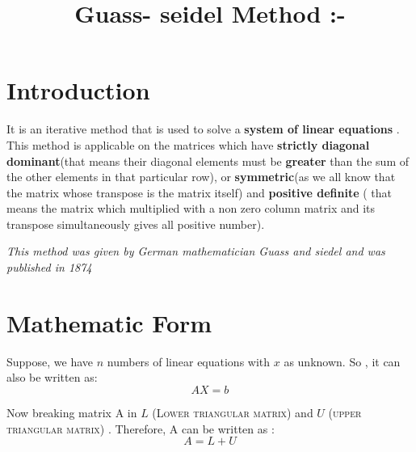 \documentclass{article}
\title{Guass- seidel Method :-}
\begin{document}
\maketitle
\section{Introduction }
It is an iterative method that is used to solve a \textbf{system of linear equations }. This method is applicable on the matrices which have \textbf{ strictly diagonal dominant}(that means their diagonal elements must be \textbf{greater} than the sum of the other elements in that particular row), or \textbf{symmetric}(as we all know that the matrix whose transpose is the matrix itself) and \textbf{positive definite} ( that means the matrix which multiplied with a non zero column matrix and its transpose simultaneously gives all positive number).

\textit{This method was given by German mathematician Guass and siedel and was published in 1874}

\section{Mathematic Form}

Suppose, we have $n$ numbers of linear equations with $x$ as unknown.
So , it can also be written as:
\begin{equation} \label{eq1}
AX = {b}
\end{equation}

Now breaking matrix A in $L$ (\textsc{Lower triangular matrix}) and  $U$ (\textsc{upper triangular matrix})   .
Therefore, A can be written as :
\begin{equation} \label{eq2}
A = L + U
\end{equation}
\end{document}
